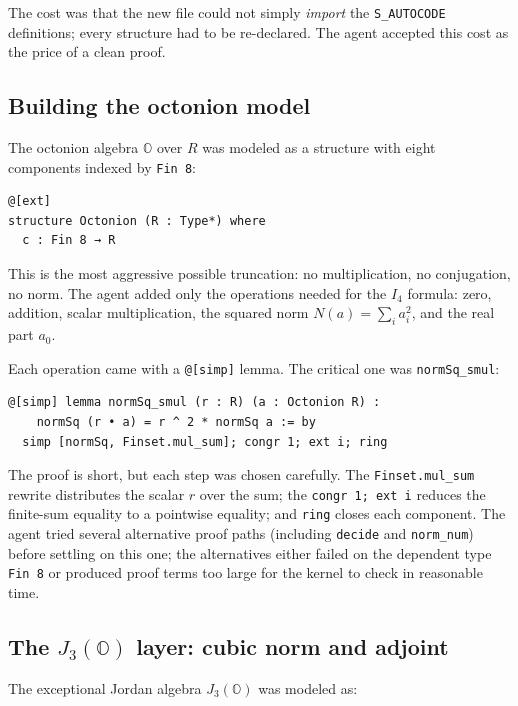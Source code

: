 \documentclass[11pt]{article}
\theoremstyle{definition}
\newcommand{\OO}{\mathbb{O}}
\newcommand{\Jthree}{J_3(\OO)}
\newcommand{\Iq}{I_4}
\begin{document}
The cost was that the new file could not simply \emph{import} the
\texttt{S\_AUTOCODE} definitions; every structure had to be re-declared.
The agent accepted this cost as the price of a clean proof.

\subsection{Building the octonion model}
\label{sec:agent-oct}

The octonion algebra $\OO$ over $R$ was modeled as a structure with eight
components indexed by \texttt{Fin 8}:

\begin{lstlisting}[language=leanL]
@[ext]
structure Octonion (R : Type*) where
  c : Fin 8 → R
\end{lstlisting}

This is the most aggressive possible truncation: no multiplication, no
conjugation, no norm. The agent added only the operations needed for
the $\Iq$ formula: zero, addition, scalar multiplication, the squared
norm $N(a)=\sum_i a_i^2$, and the real part $a_0$.

Each operation came with a \texttt{@[simp]} lemma. The critical one was
\texttt{normSq\_smul}:

\begin{lstlisting}[language=leanL]
@[simp] lemma normSq_smul (r : R) (a : Octonion R) :
    normSq (r • a) = r ^ 2 * normSq a := by
  simp [normSq, Finset.mul_sum]; congr 1; ext i; ring
\end{lstlisting}

The proof is short, but each step was chosen carefully. The
\texttt{Finset.mul\_sum} rewrite distributes the scalar $r$ over the
sum; the \texttt{congr 1; ext i} reduces the finite-sum equality to a
pointwise equality; and \texttt{ring} closes each component. The agent
tried several alternative proof paths (including \texttt{decide} and
\texttt{norm\_num}) before settling on this one; the alternatives either
failed on the dependent type \texttt{Fin 8} or produced proof terms too
large for the kernel to check in reasonable time.

\subsection{The $J_3(\OO)$ layer: cubic norm and adjoint}
\label{sec:agent-j3o}

The exceptional Jordan algebra $\Jthree$ was modeled as:
\end{document}
